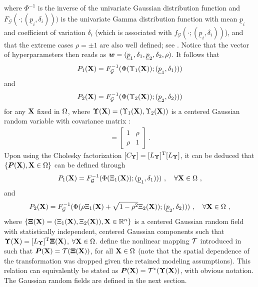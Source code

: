 where $\Phi^{-1}$ is the inverse of the univariate Gaussian distribution function and $F_\mathcal{G}(\cdot; (\underline{p}_i,\delta_{i})))$ is the univariate Gamma distribution function with mean $\underline{p}_i$ and coefficient of variation $\delta_i$ (which is associated with $f_\mathcal{G}(\cdot; (\underline{p}_i, \delta_i))$), and that the extreme cases $\rho = \pm 1$ are also well defined; see \cite{Moran1969}. Notice that the vector of hyperparameters then reads as $\boldsymbol{w} = (\underline{p}_1,\delta_{1},\underline{p}_2,\delta_{2},\rho)$. It follows that
\begin{align}
  P_1(\textbf{X}) = F_\mathcal{G}^{-1}(\Phi(\Upsilon_1(\textbf{X})); (\underline{p}_1,\delta_{1})))
\end{align}
and
\begin{align}
  P_2(\textbf{X}) = F_\mathcal{G}^{-1}(\Phi(\Upsilon_2(\textbf{X})); (\underline{p}_2,\delta_{2})))
\end{align}
for any $\textbf{X}$ fixed in $\Omega$, where $\boldsymbol{\Upsilon}(\textbf{X}) = (\Upsilon_1(\textbf{X}),\Upsilon_2(\textbf{X}))$ is a centered Gaussian random variable with covariance matrix \cite{Moran1969}:
\begin{align}
  [C_{\bs{\Upsilon}}] =
  \begin{bmatrix}
    1    & \rho \\
    \rho & 1    
  \end{bmatrix}~.
\end{align}
Upon using the Cholesky factorization $[C_{\boldsymbol{\Upsilon}}] = [L_{\boldsymbol{\Upsilon}}]^\mathrm{T} [L_{\boldsymbol{\Upsilon}}]$, it can be deduced that $\{\boldsymbol{P}(\textbf{X}), \textbf{X} \in \Omega\}$ can be defined through
\begin{align}\label{eq: def-P1}
  P_1(\textbf{X}) = F_\mathcal{G}^{-1}(\Phi(\Xi_1(\textbf{X})); (\underline{p}_1,\delta_{1})))~, \quad \forall \textbf{X} \in \Omega~,
\end{align}
and
\begin{align}\label{eq: def-P2}
  P_2(\textbf{X}) = F_\mathcal{G}^{-1}(\Phi(\rho \Xi_1(\textbf{X}) + \sqrt{1-\rho^2} \Xi_2(\textbf{X})); (\underline{p}_2,\delta_{2})))~,\quad \forall \textbf{X} \in \Omega~,
\end{align}
where $\{\boldsymbol{\Xi}(\textbf{X})=(\Xi_1(\textbf{X}),\Xi_2(\textbf{X})), \textbf{X} \in \mathbb{R}^n\}$ is a centered Gaussian random field with statistically independent, centered Gaussian components such that $\boldsymbol{\Upsilon}(\textbf{X}) = [L_{\boldsymbol{\Upsilon}}]^\mathrm{T}\boldsymbol{\Xi}(\textbf{X})$,
$\forall \textbf{X} \in \Omega$.  define the nonlinear mapping $\mathcal{T}$ introduced in  such that $\boldsymbol{P}(\textbf{X}) = \mathcal{T}(\boldsymbol{\Xi}(\textbf{X}))$,
for all $\textbf{X} \in \Omega$ (note that the spatial dependence of the transformation was dropped given the retained modeling assumptions). This relation can equivalently be stated as $\boldsymbol{P}(\textbf{X}) = \mathcal{T}^\ast(\boldsymbol{\Upsilon}(\textbf{X}))$, with obvious notation. The Gaussian random fields are defined in the next section.

